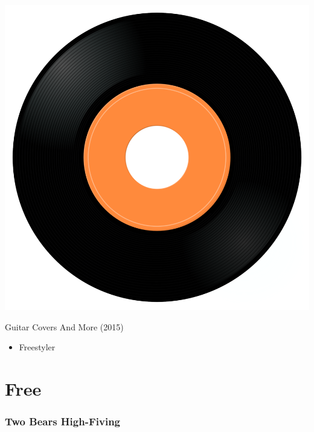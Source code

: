 \begin{minipage}[t]{0.25\textwidth}\vspace{0pt}
\captionsetup{type=figure}
\includegraphics[width=\textwidth]{Images/cover.png}
\caption*{Guitar Covers And More (2015)}
\end{minipage}
\begin{minipage}[t]{0.25\textwidth}\vspace{0pt}
\begin{itemize}[nosep,leftmargin=1em,labelwidth=*,align=left]
	\setlength{\itemsep}{0pt}
	\item Freestyler
\end{itemize}
\end{minipage}

\section{Free}

\subsubsection{Two Bears High-Fiving}

